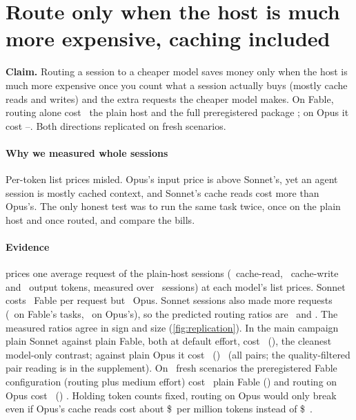 \section{Route only when the host is much more expensive, caching included}\label{sec:routing}

\textbf{Claim.} Routing a session to a cheaper model saves money only when the host is much more expensive once you
count what a session actually buys (mostly cache reads and writes) and the extra requests the cheaper model makes.
On Fable, routing alone cost \CfFableSonnetArm\X\ the plain host and the full preregistered package
\SHOneRatio\X; on Opus it cost \SHFiveRatio--\CfOpusSonnetArm\X. Both directions replicated on fresh scenarios.

\paragraph{Why we measured whole sessions} Per-token list prices misled. Opus's input price is above Sonnet's, yet
an agent session is mostly cached context, and Sonnet's cache reads cost more than Opus's. The only honest test was
to run the same task twice, once on the plain host and once routed, and compare the bills.

\paragraph{Evidence}  prices one average request of the plain-host sessions (\RqMixRead\
cache-read, \RqMixWrite\ cache-write and \RqMixOut\ output tokens, measured over \RqMixAnchors\ sessions) at each
model's list prices. Sonnet costs \RqSonnetOverFable\X\ Fable per request but \RqSonnetOverOpus\X\ Opus. Sonnet
sessions also made more requests (\RpMultFable\X\ on Fable's tasks, \RpMultOpus\X\ on Opus's), so the predicted
routing ratios are \RqPredFable\ and \RqPredOpus. The measured ratios agree in sign and size (\cref{fig:replication}).
In the main campaign plain Sonnet against plain Fable, both at default effort, cost \CfFableSonnetArm\X\
(\CfFableSonnetArmCIThree), the cleanest model-only contrast; against plain Opus it cost \CfOpusSonnetArm\X\
(\CfOpusSonnetArmCIThree) \prereg\ (all pairs; the quality-filtered pair reading is in the supplement). On \SOnePanelN\ fresh scenarios the preregistered Fable configuration (routing plus medium
effort) cost \SHOneRatio\X\ plain Fable (\SHOneCI) and routing on Opus cost \SHFiveRatio\X\ (\SHFiveCI) \prereg.
Holding token counts fixed, routing on Opus would only break even if Opus's cache reads cost about
\$\BEStickyPair\ per million tokens instead of \$\PriceOpusRead\ \expl.

